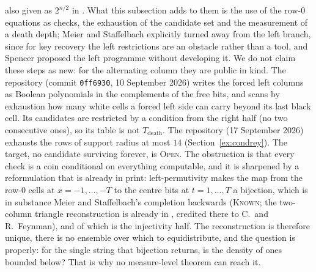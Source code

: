 \documentclass[11pt]{article}
\theoremstyle{definition}
\theoremstyle{remark}
\newcommand{\KNOWN}{\textsc{Known}}
\newcommand{\OPEN}{\textsc{Open}}
\begin{document}
also given as $2^{n/2}$ in \cite{Leon}. What this subsection adds to them is the use of the row-$0$ equations as checks, the exhaustion of the candidate set and the measurement of a death depth; Meier and Staffelbach explicitly turned away from the left branch, since for key recovery the left restrictions are an obstacle rather than a tool, and Spencer proposed the left programme without developing it. We do not claim these steps as new: for the alternating column they are public in kind. The repository \cite{Cochon} (commit \texttt{0ff6930}, 10 September 2026) writes the forced left columns as Boolean polynomials in the complements of the free bits, and scans by exhaustion how many white cells a forced left side can carry beyond its last black cell. Its candidates are restricted by a condition from the right half (no two consecutive ones), so its table is not $T_{\mathrm{death}}$. The repository \cite{Commons} (17 September 2026) exhausts the rows of support radius at most $14$ (Section~\ref{ex:condrey}). The target, no candidate surviving forever, is \OPEN. The obstruction is that every check is a coin conditional on everything computable, and it is sharpened by a reformulation that is already in print: left-permutivity makes the map from the row-$0$ cells at $x=-1,\dots,-T$ to the centre bits at $t=1,\dots,T$ a bijection, which is in substance Meier and Staffelbach's completion backwards \cite[eq.~(4)]{MS} (\KNOWN; the two-column triangle reconstruction is already in \cite{W85}, credited there to C.~and R.~Feynman), and of which \cite[Lemma~1]{Condrey} is the injectivity half. The reconstruction is therefore unique, there is no ensemble over which to equidistribute, and the question is properly: for the single string that bijection returns, is the density of ones bounded below? That is why no measure-level theorem can reach it.
\end{document}
